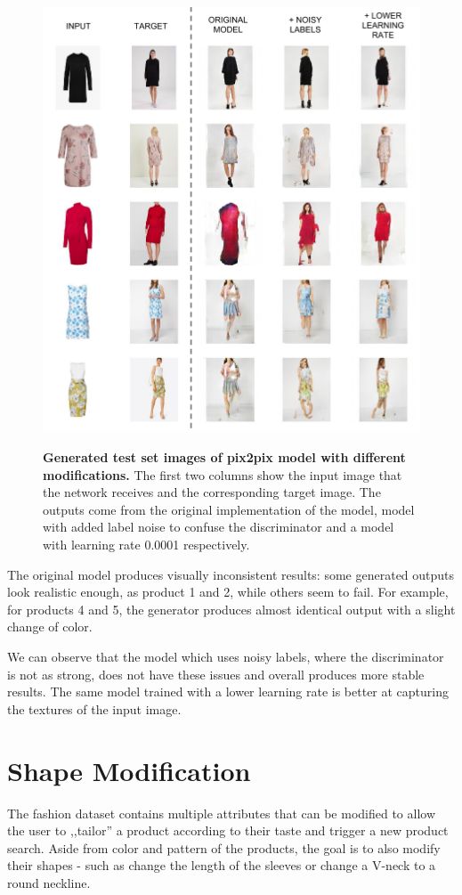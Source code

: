 \documentclass[12pt]{report}
\begin{document}
\begin{figure}[!h]
\centering
{\includegraphics[width=.8\linewidth]{04_experiments/pix2pix/results}}
\caption{\label{fig:pix2pix_results} \textbf{Generated test set images of pix2pix model with different modifications.} The first two columns show the input image that the network receives and the corresponding target image. The outputs come from the original implementation of the model, model with added label noise to confuse the discriminator and a model with learning rate 0.0001 respectively.}
\end{figure}

The original model produces visually inconsistent results: some generated outputs look realistic enough, as product 1 and 2, while others seem to fail. For example, for products 4 and 5, the generator produces almost identical output with a slight change of color.

We can observe that the model which uses noisy labels, where the discriminator is not as strong, does not have these issues and overall produces more stable results. The same model trained with a lower learning rate is better at capturing the textures of the input image. 



\pagebreak
\section{Shape Modification}
The fashion dataset contains multiple attributes that can be modified to allow the user to ,,tailor'' a product according to their taste and trigger a new product search. Aside from color and pattern of the products, the goal is to also modify their shapes - such as change the length of the sleeves or change a V-neck to a round neckline.
\end{document}
